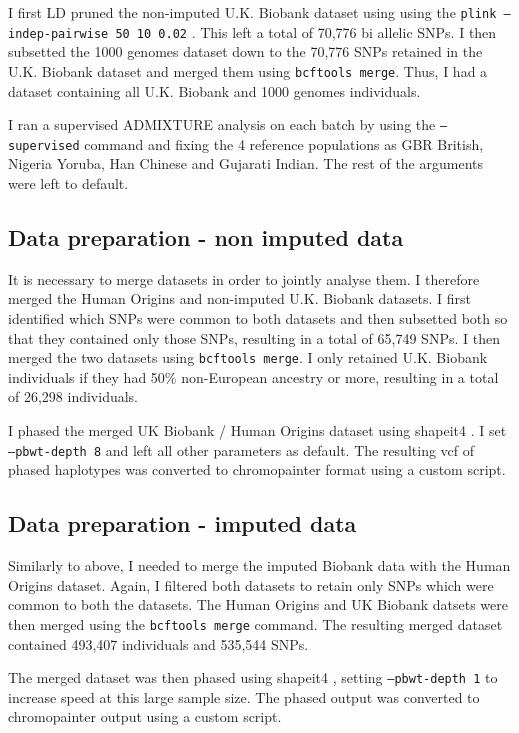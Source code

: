 I first LD pruned the non-imputed U.K. Biobank dataset using using the \texttt{plink --indep-pairwise 50 10 0.02} \cite{purcell2007plink}. This left a total of  70,776 bi allelic SNPs. I then subsetted the 1000 genomes dataset down to the 70,776 SNPs retained in the U.K. Biobank dataset and merged them using \texttt{bcftools merge}. Thus, I had a dataset containing all U.K. Biobank and 1000 genomes individuals. 

I ran a supervised ADMIXTURE analysis on each batch by using the \texttt{--supervised} command and fixing the 4 reference populations as GBR British, Nigeria Yoruba, Han Chinese and Gujarati Indian. The rest of the arguments were left to default.

\subsection{Data preparation - non imputed data}

It is necessary to merge datasets in order to jointly analyse them. I therefore merged the Human Origins and non-imputed U.K. Biobank datasets. I first identified which SNPs were common to both datasets and then subsetted both so that they contained only those SNPs, resulting in a total of 65,749 SNPs. I then merged the two datasets using \texttt{bcftools merge}. I only retained U.K. Biobank individuals if they had 50\% non-European ancestry or more, resulting in a total of 26,298 individuals. 

I phased the merged UK Biobank / Human Origins dataset using shapeit4 \cite{delaneau2018integrative}. I set \texttt{--pbwt-depth 8} and left all other parameters as default. The resulting vcf of phased haplotypes was converted to chromopainter format using a custom script.  

\subsection{Data preparation - imputed data}

Similarly to above, I needed to merge the imputed Biobank data with the Human Origins dataset. Again, I filtered both datasets to retain only SNPs which were common to both the datasets. The Human Origins and UK Biobank datsets were then merged using the \texttt{bcftools merge} command. The resulting merged dataset contained 493,407 individuals and 535,544 SNPs.

The merged dataset was then phased using shapeit4 \cite{delaneau2018integrative}, setting \texttt{--pbwt-depth 1} to increase speed at this large sample size. The phased output was converted to chromopainter output using a custom script.


